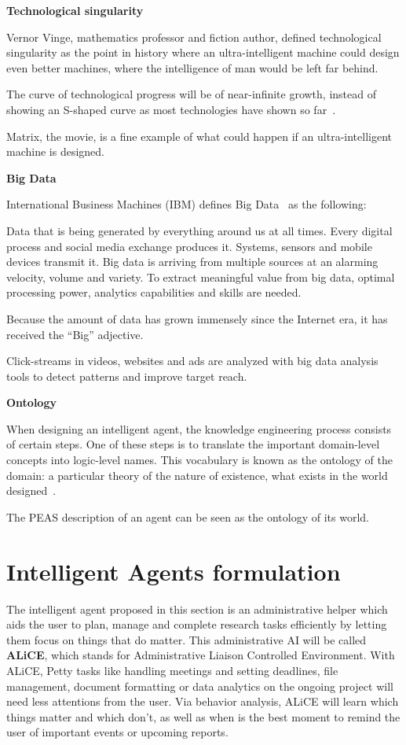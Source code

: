 \documentclass[titlepage, letterpaper, fleqn]{article}
\newcommand{\spacepls}{\vspace{5mm}}
\newcommand{\defys}[1]{
	\spacepls %
	\textbf{#1}
}
\begin{document}
\defys{Technological singularity}

Vernor Vinge, mathematics professor and fiction author, defined technological singularity as the point in history where an ultra-intelligent machine could design even better machines, where the intelligence of man would be left far behind.

The curve of technological progress will be of near-infinite growth, instead of showing an S-shaped curve as most technologies have shown so far~\cite{TechSing}.

Matrix, the movie, is a fine example of what could happen if an ultra-intelligent machine is designed.

\defys{Big Data}

International Business Machines (IBM) defines Big Data~\cite{Big} as the following:

\begin{displayquote}
    Data that is being generated by everything around us at all times.
    Every digital process and social media exchange produces it.
    Systems, sensors and mobile devices transmit it.
    Big data is arriving from multiple sources at an alarming velocity, volume and variety.
    To extract meaningful value from big data, optimal processing power, analytics capabilities and skills are needed.
\end{displayquote}

Because the amount of data has grown immensely since the Internet era, it has received the ``Big'' adjective.

Click-streams in videos, websites and ads are analyzed with big data analysis tools to detect patterns and improve target reach.

\defys{Ontology}

When designing an intelligent agent, the knowledge engineering process consists of certain steps.
One of these steps is to translate the important domain-level concepts into logic-level names.
This vocabulary is known as the ontology of the domain:
a particular theory of the nature of existence, what exists in the world designed~\cite{Onto}.

The PEAS description of an agent can be seen as the ontology of its world.

\section{Intelligent Agents formulation}
\label{sec:agent}

The intelligent agent proposed in this section is an administrative helper which aids the user to plan, manage and complete research tasks efficiently by letting them focus on things that do matter.
This administrative AI will be called \textbf{ALiCE}, which stands for Administrative Liaison Controlled Environment.
With ALiCE, Petty tasks like handling meetings and setting deadlines, file management, document formatting or data analytics on the ongoing project will need less attentions from the user.
Via behavior analysis, ALiCE will learn which things matter and which don't, as well as when is the best moment to remind the user of important events or upcoming reports.
\end{document}
